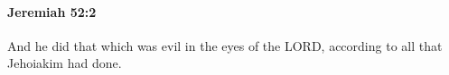
		\paragraph{Jeremiah 52:2} %
			\label{JEREMIAH-52-2}

			And he did that which was evil in the eyes of the LORD, according to all that Jehoiakim had done.


